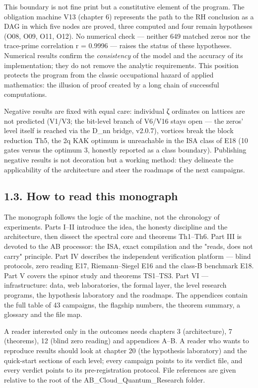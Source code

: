 \documentclass[11pt,a4paper]{article}
\begin{document}
This boundary is not fine print but a constitutive element of the program. The obligation machine V13 (chapter 6) represents the path to the RH conclusion as a DAG in which five nodes are proved, three computed and four remain hypotheses (O08, O09, O11, O12). No numerical check — neither 649 matched zeros nor the trace-prime correlation r = 0.9996 — raises the status of these hypotheses. Numerical results confirm the \emph{consistency} of the model and the accuracy of its implementation; they do not remove the analytic requirements. This position protects the program from the classic occupational hazard of applied mathematics: the illusion of proof created by a long chain of successful computations.

Negative results are fixed with equal care: individual ζ ordinates on lattices are not predicted (V1/V3; the bit-level branch of V6/V16 stays open — the zeros' level itself is reached via the D\_nn bridge, v2.0.7), vortices break the block reduction Th5, the 2q KAK optimum is unreachable in the ISA class of E18 (10 gates versus the optimum 3, honestly reported as a class boundary). Publishing negative results is not decoration but a working method: they delineate the applicability of the architecture and steer the roadmaps of the next campaigns.

\subsection{1.3. How to read this monograph}

The monograph follows the logic of the machine, not the chronology of experiments. Parts I–II introduce the idea, the honesty discipline and the architecture, then dissect the spectral core and theorems Th1–Th6. Part III is devoted to the AB processor: the ISA, exact compilation and the "reads, does not carry" principle. Part IV describes the independent verification platform — blind protocols, zero reading E17, Riemann–Siegel E16 and the class-B benchmark E18. Part V covers the spinor study and theorems TS1–TS3. Part VI — infrastructure: data, web laboratories, the formal layer, the level research programs, the hypothesis laboratory and the roadmaps. The appendices contain the full table of 43 campaigns, the flagship numbers, the theorem summary, a glossary and the file map.

A reader interested only in the outcomes needs chapters 3 (architecture), 7 (theorems), 12 (blind zero reading) and appendices A–B. A reader who wants to reproduce results should look at chapter 20 (the hypothesis laboratory) and the quick-start sections of each level; every campaign points to its verdict file, and every verdict points to its pre-registration protocol. File references are given relative to the root of the AB\_Cloud\_Quantum\_Research folder.
\end{document}
